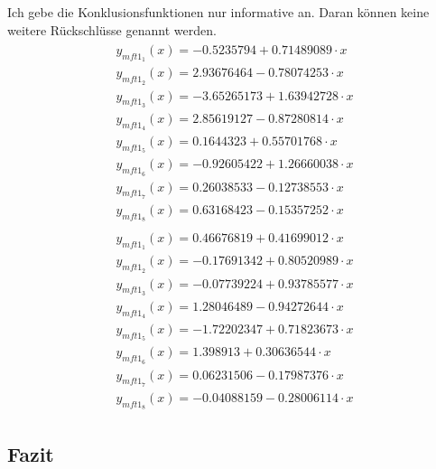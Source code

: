 Ich gebe die Konklusionsfunktionen nur informative an. Daran können keine weitere Rückschlüsse genannt werden. 
\begin{align}
\begin{split}\label{8mf_0:10}
y_{mft1_1}(x) = -0.5235794 + 0.71489089\cdot x \\
y_{mft1_2}(x) = 2.93676464 - 0.78074253\cdot x \\
y_{mft1_3}(x) = -3.65265173 + 1.63942728\cdot x \\
y_{mft1_4}(x) = 2.85619127 - 0.87280814\cdot x \\
y_{mft1_5}(x) = 0.1644323 + 0.55701768\cdot x \\
y_{mft1_6}(x) = -0.92605422 + 1.26660038\cdot x \\
y_{mft1_7}(x) = 0.26038533 - 0.12738553\cdot x \\
y_{mft1_8}(x) = 0.63168423 - 0.15357252\cdot x
\end{split} \\
\begin{split}\label{8mf_1:10}
y_{mft1_1}(x) = 0.46676819 + 0.41699012\cdot x \\
y_{mft1_2}(x) = -0.17691342 + 0.80520989\cdot x \\
y_{mft1_3}(x) = -0.07739224 + 0.93785577\cdot x \\
y_{mft1_4}(x) = 1.28046489 - 0.94272644\cdot x \\
y_{mft1_5}(x) = -1.72202347 + 0.71823673\cdot x \\
y_{mft1_6}(x) = 1.398913 + 0.30636544\cdot x \\
y_{mft1_7}(x) = 0.06231506 - 0.17987376\cdot x \\
y_{mft1_8}(x) = -0.04088159 - 0.28006114\cdot x
\end{split}	
\end{align}

%	
\subsection{Fazit}

